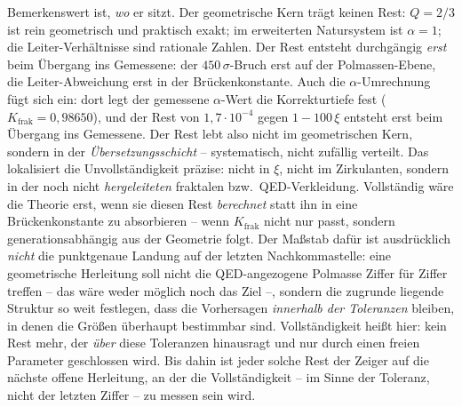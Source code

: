 Bemerkenswert ist, \emph{wo} er sitzt. Der geometrische Kern trägt keinen
Rest: $Q=2/3$ ist rein geometrisch und praktisch exakt; im erweiterten
Natursystem ist $\alpha=1$; die Leiter-Verhältnisse sind rationale Zahlen.
Der Rest entsteht durchgängig \emph{erst} beim Übergang ins Gemessene: der
$450\,\sigma$-Bruch erst auf der Polmassen-Ebene, die Leiter-Abweichung
erst in der Brückenkonstante. Auch die $\alpha$-Umrechnung fügt sich ein: dort legt der gemessene
$\alpha$-Wert die Korrekturtiefe fest ($K_{\text{frak}} = 0{,}98650$), und der
Rest von $1{,}7\cdot10^{-4}$ gegen $1-100\,\xi$ entsteht erst beim Übergang
ins Gemessene. Der Rest lebt also nicht im geometrischen Kern, sondern in
der \emph{Übersetzungsschicht} -- systematisch, nicht zufällig verteilt. Das
lokalisiert die Unvollständigkeit präzise: nicht in $\xi$, nicht im
Zirkulanten, sondern in der noch nicht \emph{hergeleiteten} fraktalen bzw.\
QED-Verkleidung. Vollständig wäre die Theorie erst, wenn sie diesen Rest
\emph{berechnet} statt ihn in eine Brückenkonstante zu absorbieren -- wenn
$K_{\text{frak}}$ nicht nur passt, sondern generationsabhängig aus der
Geometrie folgt. Der Maßstab dafür ist ausdrücklich \emph{nicht} die
punktgenaue Landung auf der letzten Nachkommastelle: eine geometrische
Herleitung soll nicht die QED-angezogene Polmasse Ziffer für Ziffer treffen
-- das wäre weder möglich noch das Ziel --, sondern die zugrunde liegende
Struktur so weit festlegen, dass die Vorhersagen \emph{innerhalb der
Toleranzen} bleiben, in denen die Größen überhaupt bestimmbar sind.
Vollständigkeit heißt hier: kein Rest mehr, der \emph{über} diese Toleranzen
hinausragt und nur durch einen freien Parameter geschlossen wird. Bis dahin
ist jeder solche Rest der Zeiger auf die nächste offene Herleitung, an der
die Vollständigkeit -- im Sinne der Toleranz, nicht der letzten Ziffer -- zu
messen sein wird.
